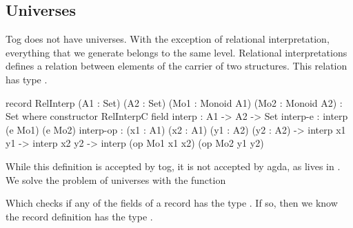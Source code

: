 \subsection{Universes}
Tog does not have universes. With the exception of relational interpretation, everything that we generate belongs to the same level. Relational interpretations defines a relation between elements of the carrier of two structures. This relation has type . 
\begin{togcode}
record RelInterp (A1 : Set) (A2 : Set) 
            (Mo1 : Monoid A1) (Mo2 : Monoid A2) : Set where
 constructor RelInterpC
 field
  interp : A1 -> A2 -> Set
  interp-e : interp (e Mo1) (e Mo2)
  interp-op : (x1 : A1) (x2 : A1) (y1 : A2) (y2 : A2) ->
                    interp x1 y1 ->
                    interp x2 y2 ->
                    interp (op Mo1 x1 x2) (op Mo2 y1 y2)
\end{togcode} 
While this definition is accepted by tog, it is not accepted by agda, as  lives in . We solve the problem of universes with the  function 
Which checks if any of the fields of a record has the type . If so, then we know the record definition has the type . 

